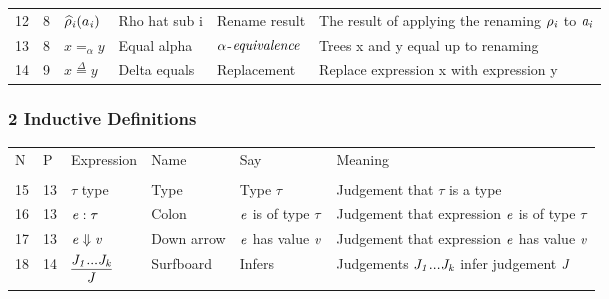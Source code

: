 \documentclass[12pt]{article}
\begin{document}
\begin{tabular}[b] {p{} p{} p{} p{} 
p{} p{}}
12& 8& $\widehat{\rho}_{\it{i}} (a_{\it{i}})$ & Rho hat sub i & Rename result & The result of applying the renaming $ \rho_ {\it{i}} $ to $ \it{a}_{\it{i}} $ \\
13& 8& $x =_\alpha y$ & Equal alpha & $ \it{\alpha}$-$\it{equivalence} $ & Trees x and y equal up to renaming \\
14& 9& $x \overset{\Delta}{=} y$ & Delta equals & Replacement & Replace expression x with expression y \\
\end{tabular}

\subsubsection*{2 Inductive Definitions}
\begin{tabular}[b] {p{} p{} p{} p{} 
p{} p{}}
N & P & Expression & Name & Say & Meaning \\ \\

15& 13& $\tau$ type& Type & Type $\tau$ & Judgement that $\tau$ is a type \\
16& 13& $\it{e} : \tau$ & Colon &  $\it{e}$ is of type $\tau$ & Judgement that expression $\it{e}$ is of type $\tau$ \\
17& 13& $\it{e} \Downarrow \it{v}$ & Down arrow &  $\it{e}$ has value $\it{v} $ & Judgement that expression $\it{e}$ has value $\it{v} $\\
18& 14& $\infer {\it{J}} {\it{J}_{1}...\it{J}_{\it{k}}}$  & Surfboard & Infers & Judgements ${\it{J}_{1}...\it{J}_{\it{k}}}$ infer judgement ${\it{J}}$\\

\end{tabular}
\end{document}
